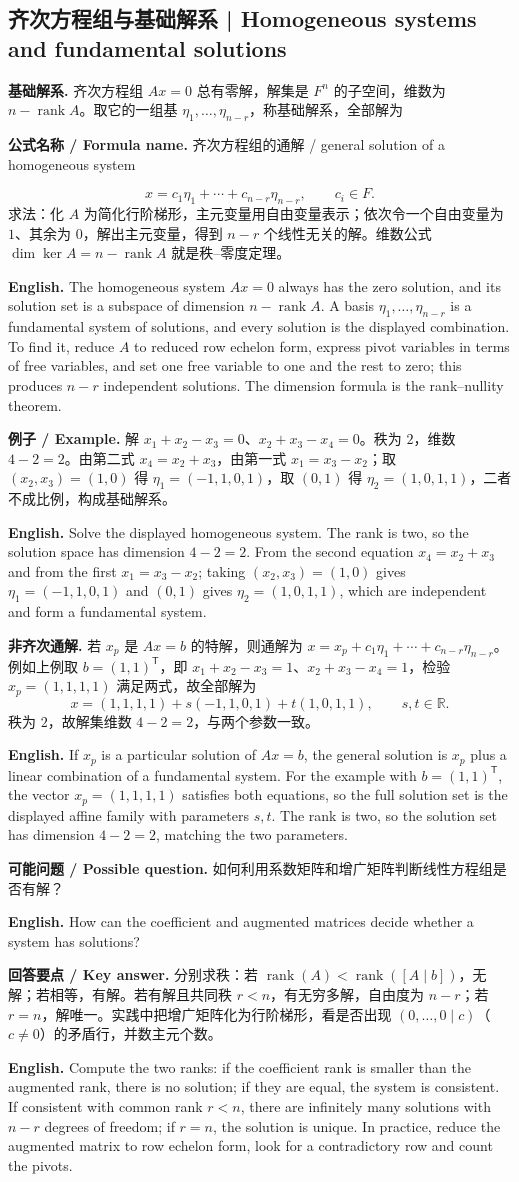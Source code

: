 \documentclass[UTF8,11pt,a4paper]{ctexart}
\newcommand{\EN}[1]{\par\noindent\textbf{English.} #1\par}
\newcommand{\FORMULA}[2]{\par\noindent\textbf{公式名称 / Formula name.} #1 / #2\par}
\newcommand{\EX}[2]{\par\noindent\textbf{例子 / Example.} #1\par\EN{#2}}
\newcommand{\ASK}[4]{\par\noindent\textbf{可能问题 / Possible question.} #1\par\EN{#2}\noindent\textbf{回答要点 / Key answer.} #3\par\EN{#4}\medskip}
\begin{document}
\subsection{齐次方程组与基础解系 | Homogeneous systems and fundamental solutions}
\noindent\textbf{基础解系.} 齐次方程组 $Ax=0$ 总有零解，解集是 $F^n$ 的子空间，维数为 $n-\operatorname{rank}A$。取它的一组基 $\eta_1,\dots,\eta_{n-r}$，称基础解系，全部解为
\FORMULA{齐次方程组的通解}{general solution of a homogeneous system}
\[
x=c_1\eta_1+\cdots+c_{n-r}\eta_{n-r},\qquad c_i\in F.
\]
求法：化 $A$ 为简化行阶梯形，主元变量用自由变量表示；依次令一个自由变量为 $1$、其余为 $0$，解出主元变量，得到 $n-r$ 个线性无关的解。维数公式 $\dim\ker A=n-\operatorname{rank}A$ 就是秩--零度定理。
\EN{The homogeneous system $Ax=0$ always has the zero solution, and its solution set is a subspace of dimension $n-\operatorname{rank}A$. A basis $\eta_1,\dots,\eta_{n-r}$ is a fundamental system of solutions, and every solution is the displayed combination. To find it, reduce $A$ to reduced row echelon form, express pivot variables in terms of free variables, and set one free variable to one and the rest to zero; this produces $n-r$ independent solutions. The dimension formula is the rank--nullity theorem.}
\EX{解 $x_1+x_2-x_3=0$、$x_2+x_3-x_4=0$。秩为 $2$，维数 $4-2=2$。由第二式 $x_4=x_2+x_3$，由第一式 $x_1=x_3-x_2$；取 $(x_2,x_3)=(1,0)$ 得 $\eta_1=(-1,1,0,1)$，取 $(0,1)$ 得 $\eta_2=(1,0,1,1)$，二者不成比例，构成基础解系。}{Solve the displayed homogeneous system. The rank is two, so the solution space has dimension $4-2=2$. From the second equation $x_4=x_2+x_3$ and from the first $x_1=x_3-x_2$; taking $(x_2,x_3)=(1,0)$ gives $\eta_1=(-1,1,0,1)$ and $(0,1)$ gives $\eta_2=(1,0,1,1)$, which are independent and form a fundamental system.}
\noindent\textbf{非齐次通解.} 若 $x_p$ 是 $Ax=b$ 的特解，则通解为 $x=x_p+c_1\eta_1+\cdots+c_{n-r}\eta_{n-r}$。例如上例取 $b=(1,1)^{\mathsf T}$，即 $x_1+x_2-x_3=1$、$x_2+x_3-x_4=1$，检验 $x_p=(1,1,1,1)$ 满足两式，故全部解为
\[
x=(1,1,1,1)+s(-1,1,0,1)+t(1,0,1,1),\qquad s,t\in\mathbb R.
\]
秩为 $2$，故解集维数 $4-2=2$，与两个参数一致。
\EN{If $x_p$ is a particular solution of $Ax=b$, the general solution is $x_p$ plus a linear combination of a fundamental system. For the example with $b=(1,1)^{\mathsf T}$, the vector $x_p=(1,1,1,1)$ satisfies both equations, so the full solution set is the displayed affine family with parameters $s,t$. The rank is two, so the solution set has dimension $4-2=2$, matching the two parameters.}
\ASK{如何利用系数矩阵和增广矩阵判断线性方程组是否有解？}{How can the coefficient and augmented matrices decide whether a system has solutions?}{分别求秩：若 $\operatorname{rank}(A)<\operatorname{rank}([A\mid b])$，无解；若相等，有解。若有解且共同秩 $r<n$，有无穷多解，自由度为 $n-r$；若 $r=n$，解唯一。实践中把增广矩阵化为行阶梯形，看是否出现 $(0,\dots,0\mid c)$（$c\ne0$）的矛盾行，并数主元个数。}{Compute the two ranks: if the coefficient rank is smaller than the augmented rank, there is no solution; if they are equal, the system is consistent. If consistent with common rank $r<n$, there are infinitely many solutions with $n-r$ degrees of freedom; if $r=n$, the solution is unique. In practice, reduce the augmented matrix to row echelon form, look for a contradictory row and count the pivots.}
\end{document}
